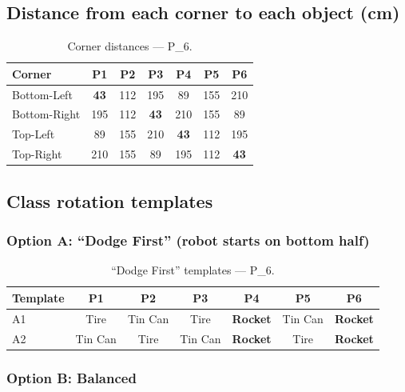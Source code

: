 \documentclass[a4]{article}
\begin{document}
\subsection*{Distance from each corner to each object (cm)}

\begin{table}[H]
\centering
\begin{tabular}{lcccccc}
\toprule
\textbf{Corner} & \textbf{P1} & \textbf{P2} & \textbf{P3} & \textbf{P4} & \textbf{P5} & \textbf{P6} \\
\midrule
Bottom-Left & \textbf{43} & 112 & 195 & 89 & 155 & 210 \\
Bottom-Right & 195 & 112 & \textbf{43} & 210 & 155 & 89 \\
Top-Left & 89 & 155 & 210 & \textbf{43} & 112 & 195 \\
Top-Right & 210 & 155 & 89 & 195 & 112 & \textbf{43} \\
\bottomrule
\end{tabular}
\caption{Corner distances --- P\_6.}
\end{table}

\subsection*{Class rotation templates}

\subsubsection*{Option A: ``Dodge First'' (robot starts on bottom half)}

\begin{table}[H]
\centering
\begin{tabular}{lcccccc}
\toprule
\textbf{Template} & \textbf{P1} & \textbf{P2} & \textbf{P3} & \textbf{P4} & \textbf{P5} & \textbf{P6} \\
\midrule
A1 & Tire & Tin Can & Tire & \textbf{Rocket} & Tin Can & \textbf{Rocket} \\
A2 & Tin Can & Tire & Tin Can & \textbf{Rocket} & Tire & \textbf{Rocket} \\
\bottomrule
\end{tabular}
\caption{``Dodge First'' templates --- P\_6.}
\end{table}

\subsubsection*{Option B: Balanced}
\end{document}

